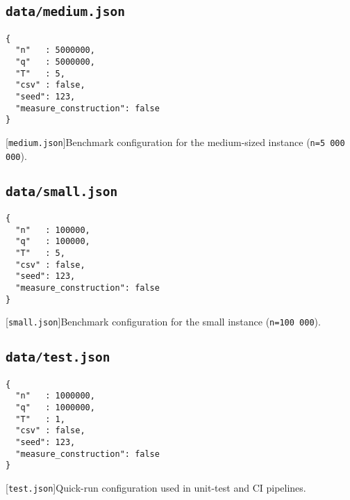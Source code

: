 \subsection{\texttt{data/medium.json}}
\label{secsec:data-medium-json}
\begin{lstlisting}
{
  "n"   : 5000000,
  "q"   : 5000000,
  "T"   : 5,
  "csv" : false,
  "seed": 123,
  "measure_construction": false
}
\end{lstlisting}
[\texttt{medium.json}]{Benchmark configuration for the
medium-sized instance (\texttt{n=5\,000\,000}).}
\label{lst:data-medium-json}

\subsection{\texttt{data/small.json}}
\label{secsec:data-small-json}
\begin{lstlisting}
{
  "n"   : 100000,
  "q"   : 100000,
  "T"   : 5,
  "csv" : false,
  "seed": 123,
  "measure_construction": false
}
\end{lstlisting}
[\texttt{small.json}]{Benchmark configuration for the
small instance (\texttt{n=100\,000}).}
\label{lst:data-small-json}

\subsection{\texttt{data/test.json}}
\label{secsec:data-test-json}
\begin{lstlisting}
{
  "n"   : 1000000,
  "q"   : 1000000,
  "T"   : 1,
  "csv" : false,
  "seed": 123,
  "measure_construction": false
}
\end{lstlisting}
[\texttt{test.json}]{Quick-run configuration used in
unit-test and CI pipelines.}
\label{lst:data-test-json}

